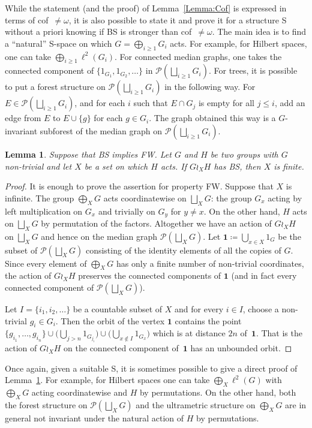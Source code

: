 \documentclass[a4paper]{article}
\newtheorem{lem}{Lemma}[section]
\theoremstyle{definition}
\newcommand*{\powerset}[1]{\mathcal P(#1)}
\begin{document}
%
%
While the statement (and the proof) of Lemma~\ref{Lemma:Cof} is expressed in terms of cof~$\neq\omega$, it is also possible to state it and prove it for a structure S without a priori knowing if BS is stronger than cof~$\neq\omega$.
The main idea is to find a ``natural'' S-space on which $G=\bigoplus_{i\geq 1}G_i$ acts. For example, for Hilbert spaces, one can take $\bigoplus_{i\geq 1}\ell^2(G_i)$. For connected median graphs, one takes the connected component of $\{1_{G_1},1_{G_2},\dots\}$ in $\powerset{\bigsqcup_{i\geq 1} G_i}$.
For trees, it is possible to put a forest structure on $\powerset{\bigsqcup_{i\geq 1} G_i}$ in the following way.
For $E\in\powerset{\bigsqcup_{i\geq 1} G_i}$, and for each $i$ such that $E\cap G_j$ is empty for all $j\leq i$, add an edge from $E$ to $E\cup\{g\}$ for each $g\in G_i$. The graph obtained this way is a $G$-invariant subforest of the median graph on $\powerset{\bigsqcup_{i\geq 1} G_i}$.
%
%
\begin{lem}\label{Lemma:XFinite}
Suppose that BS implies FW.
Let $G$ and $H$ be two groups with $G$ non-trivial and let $X$ be a set on which $H$ acts.
If $G\wr_XH$ has BS, then $X$ is finite.
\end{lem}
\begin{proof}
It is enough to prove the assertion for property FW.
Suppose that $X$ is infinite.
The group $\bigoplus_XG$ acts coordinatewise on  $\bigsqcup_XG$: the group $G_x$ acting by left multiplication on $G_x$ and trivially on $G_y$ for $y\neq x$. On the other hand, $H$ acts on $\bigsqcup_XG$ by permutation of the factors.
Altogether we have an action of $G\wr_XH$ on $\bigsqcup_XG$ and hence on the median graph $\powerset{\bigsqcup_XG}$.
Let $\mathbf 1\coloneqq\bigcup_{x\in X} 1_{G}$ be the subset of $\powerset{\bigsqcup_XG}$ consisting of the identity elements of all the copies of $G$.
Since every element of $\bigoplus_XG$ has only a finite number of non-trivial coordinates, the action of $G\wr_XH$ preserves the connected components of $\mathbf 1$ (and in fact every connected component of $\powerset{\bigsqcup_XG}$).

Let $I=\{i_1,i_2,\dots\}$ be a countable subset of $X$ and for every $i\in I$, choose a non-trivial $g_i\in G_{i}$.
Then the orbit of the vertex $\mathbf 1$ contains the point $\{g_{i_1},\dots, g_{i_n}\}\cup\bigl(\bigcup_{j>n} 1_{G_{j_i}}\bigr)\cup\bigl(\bigcup_{x\notin I} 1_{G_{x}}\bigr)$ which is at distance $2n$ of~$\mathbf 1$.
That is the action of $G\wr_XH$ on the connected component of~$\mathbf 1$ has an unbounded orbit.
\end{proof}
%
%
Once again, given a suitable S, it is sometimes possible to give a direct proof of Lemma~\ref{Lemma:XFinite}.
For example, for Hilbert spaces one can take $\bigoplus_X\ell^2(G)$ with $\bigoplus_XG$ acting coordinatewise and $H$ by permutations.
On the other hand, both the forest structure on $\powerset{\bigsqcup_XG}$ and the ultrametric structure on $\bigoplus_XG$ are in general not invariant under the natural action of $H$ by permutations.
\end{document}
